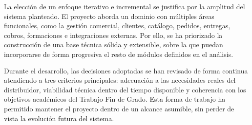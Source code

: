La elección de un enfoque iterativo e incremental se justifica por la amplitud del sistema planteado. El proyecto aborda un dominio con múltiples áreas funcionales, como la gestión comercial, clientes, catálogo, pedidos, entregas, cobros, formaciones e integraciones externas. Por ello, se ha priorizado la construcción de una base técnica sólida y extensible, sobre la que puedan incorporarse de forma progresiva el resto de módulos definidos en el análisis.

Durante el desarrollo, las decisiones adoptadas se han revisado de forma continua atendiendo a tres criterios principales: adecuación a las necesidades reales del distribuidor, viabilidad técnica dentro del tiempo disponible y coherencia con los objetivos académicos del Trabajo Fin de Grado. Esta forma de trabajo ha permitido mantener el proyecto dentro de un alcance asumible, sin perder de vista la evolución futura del sistema.